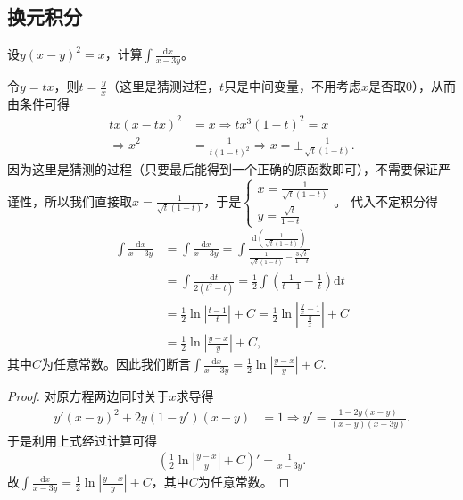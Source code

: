 \documentclass[../../main.tex]{subfiles}
\begin{document}
\subsection{换元积分}

\begin{example}
设\(y(x - y)^2 = x\)，计算\(\int \frac{\mathrm{d}x}{x - 3y}\)。 
\end{example}
\begin{note}
令\(y = tx\)，则\(t = \frac{y}{x}\)（这里是猜测过程，\(t\)只是中间变量，不用考虑\(x\)是否取\(0\)），从而由条件可得
\begin{align*}
tx(x - tx)^2 &= x \Rightarrow tx^3(1 - t)^2 = x\\
\Rightarrow x^2&=\frac{1}{t(1 - t)^2} \Rightarrow x = \pm\frac{1}{\sqrt{t}(1 - t)}.
\end{align*}
因为这里是猜测的过程（只要最后能得到一个正确的原函数即可），不需要保证严谨性，所以我们直接取\(x=\frac{1}{\sqrt{t}(1 - t)}\)，于是\(\begin{cases}
x=\frac{1}{\sqrt{t}(1 - t)}\\
y=\frac{\sqrt{t}}{1 - t}
\end{cases}\)。
代入不定积分得
\begin{align*}
\int{\frac{\mathrm{d}x}{x - 3y}}&=\int{\frac{\mathrm{d}x}{x - 3y}}=\int{\frac{\mathrm{d}\left(\frac{1}{\sqrt{t}(1 - t)}\right)}{\frac{1}{\sqrt{t}(1 - t)}-\frac{3\sqrt{t}}{1 - t}}}\\
&=\int{\frac{\mathrm{d}t}{2(t^2 - t)}}=\frac{1}{2}\int{\left(\frac{1}{t - 1}-\frac{1}{t}\right)\mathrm{d}t}\\
&=\frac{1}{2}\ln\left|\frac{t - 1}{t}\right| + C=\frac{1}{2}\ln\left|\frac{\frac{y}{x}-1}{\frac{y}{x}}\right| + C\\
&=\frac{1}{2}\ln\left|\frac{y - x}{y}\right| + C,
\end{align*}
其中\(C\)为任意常数。因此我们断言\(\int{\frac{\mathrm{d}x}{x - 3y}}=\frac{1}{2}\ln\left|\frac{y - x}{y}\right| + C\).
\end{note}
\begin{proof}
对原方程两边同时关于\(x\)求导得
\begin{align*}
y'(x - y)^2 + 2y(1 - y')(x - y) &= 1 \Rightarrow y'=\frac{1 - 2y(x - y)}{(x - y)(x - 3y)}.
\end{align*}
于是利用上式经过计算可得
\begin{align*}
\left(\frac{1}{2}\ln\left|\frac{y - x}{y}\right| + C\right)'=\frac{1}{x - 3y}.
\end{align*}
故\(\int{\frac{\mathrm{d}x}{x - 3y}}=\frac{1}{2}\ln\left|\frac{y - x}{y}\right| + C\)，其中\(C\)为任意常数。 

\end{proof}
\end{document}
